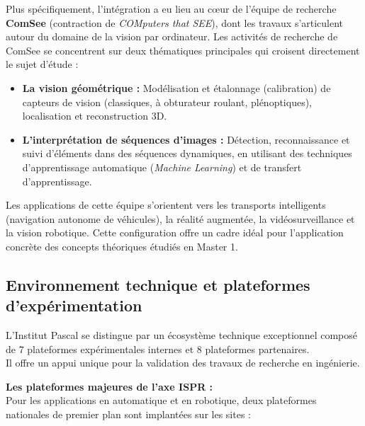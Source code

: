\documentclass[12pt,a4paper,oneside]{report}
\begin{document}
Plus spécifiquement, l'intégration a eu lieu au cœur de l'équipe de recherche \textbf{ComSee} (contraction de \textit{COMputers that SEE}), dont les travaux s'articulent autour du domaine de la vision par ordinateur. Les activités de recherche de ComSee se concentrent sur deux thématiques principales qui croisent directement le sujet d'étude :
\begin{itemize}[label=\textbullet]
    \item \textbf{La vision géométrique :} Modélisation et étalonnage (calibration) de capteurs de vision (classiques, à obturateur roulant, plénoptiques), localisation et reconstruction 3D.
    \item \textbf{L'interprétation de séquences d'images :} Détection, reconnaissance et suivi d'éléments dans des séquences dynamiques, en utilisant des techniques d'apprentissage automatique (\textit{Machine Learning}) et de transfert d'apprentissage.
\end{itemize}

Les applications de cette équipe s'orientent vers les transports intelligents (navigation autonome de véhicules), la réalité augmentée, la vidéosurveillance et la vision robotique. Cette configuration offre un cadre idéal pour l'application concrète des concepts théoriques étudiés en Master 1.

\subsection{Environnement technique et plateformes d'expérimentation}

\vspace{1cm}

L'Institut Pascal se distingue par un écosystème technique exceptionnel composé de 7 plateformes expérimentales internes et 8 plateformes partenaires.\\
Il offre un appui unique pour la validation des travaux de recherche en ingénierie.\\

\bigskip

\textbf{Les plateformes majeures de l'axe ISPR :}\\
\hspace*{1cm} Pour les applications en automatique et en robotique, deux plateformes nationales de premier plan sont implantées sur les sites :\vspace{0.05cm}
\end{document}
